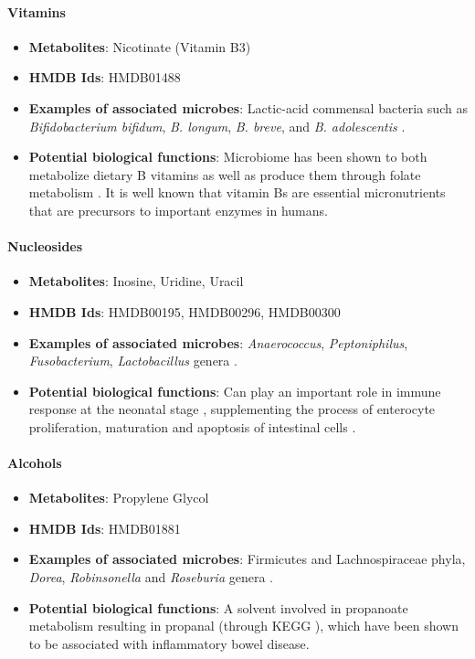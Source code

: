 \paragraph{Vitamins}  
\begin{itemize}
    \item \textbf{Metabolites}: Nicotinate (Vitamin B3) 
    \item \textbf{HMDB Ids}: HMDB01488 
    \item \textbf{Examples of associated microbes}: Lactic-acid commensal bacteria such as \emph{Bifidobacterium bifidum}, \emph{B. longum}, \emph{B. breve}, and \emph{B. adolescentis} \cite{leblanc2013bacteria}.
    \item \textbf{Potential biological functions}: Microbiome has been shown to both metabolize dietary B vitamins as well as produce them through folate metabolism \cite{leblanc2013bacteria}. It is well known that vitamin Bs are essential micronutrients that are precursors to important enzymes in humans. 
\end{itemize}

\paragraph{Nucleosides}  
\begin{itemize}
    \item \textbf{Metabolites}: Inosine, Uridine, Uracil 
    \item \textbf{HMDB Ids}: HMDB00195, HMDB00296, HMDB00300 
    \item \textbf{Examples of associated microbes}: \emph{Anaerococcus}, \emph{Peptoniphilus}, \emph{Fusobacterium}, \emph{Lactobacillus} genera \cite{doo2017effect}.  
    \item \textbf{Potential biological functions}: Can play an important role in immune response at the neonatal stage \cite{waititu2017dietary}, supplementing the process of enterocyte proliferation, maturation and apoptosis of intestinal cells \cite{sato1999vitro}. 
\end{itemize}

\paragraph{Alcohols}  
\begin{itemize}
    \item \textbf{Metabolites}: Propylene Glycol 
    \item \textbf{HMDB Ids}: HMDB01881
    \item \textbf{Examples of associated microbes}: Firmicutes and Lachnospiraceae phyla, \emph{Dorea}, \emph{Robinsonella} and \emph{Roseburia} genera \cite{raman2013fecal}.  
    \item \textbf{Potential biological functions}: A solvent involved in propanoate metabolism resulting in propanal (through KEGG \cite{kanehisa2019understanding}), which have been shown to be associated with inflammatory bowel disease. 
\end{itemize}

